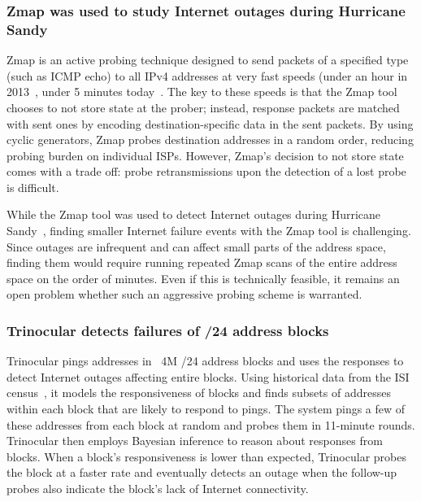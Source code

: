 \subsubsection{Zmap was used to study Internet outages during
  Hurricane Sandy}


Zmap is an active probing technique designed to send packets of a
specified type (such as ICMP echo) to all IPv4 addresses at
very fast speeds (under an hour in 2013~\cite{durumeric2013zmap},
under 5 minutes today~\cite{}. The key to these speeds is that the
Zmap tool chooses to not store state at the prober; instead, response
packets are matched with sent ones by encoding destination-specific data
in the sent packets. By using cyclic generators, Zmap probes
destination addresses in a random order, reducing probing burden on
individual ISPs. However, Zmap's decision to not store state comes
with a trade off: probe retransmissions upon the detection of a lost
probe is difficult.

While the Zmap
tool was used to detect Internet outages during Hurricane
Sandy~\cite{durumeric2013zmap}, finding smaller Internet failure
events with the Zmap tool is challenging. Since outages are infrequent and can affect small parts of
the address space, finding them would require running repeated Zmap
scans of the entire address space on the order of minutes. Even if this is technically feasible,
it remains an open problem whether such an aggressive probing scheme
is warranted.

\subsubsection{Trinocular detects failures of /24 address blocks}

Trinocular pings addresses in ~4M /24 address blocks and
uses the responses to detect Internet outages affecting entire blocks. Using historical
data from the ISI census~\cite{census-survey}, it models the responsiveness of
blocks and finds subsets of addresses within each block that are
likely to respond to pings. The system pings a few of these addresses
from each block at random and probes them in 11-minute
rounds. Trinocular then employs Bayesian inference to reason about
responses from blocks. When a block's responsiveness is lower than
expected, Trinocular probes the block at a faster rate and eventually
detects an outage when the follow-up probes also indicate the block's
lack of Internet connectivity.

